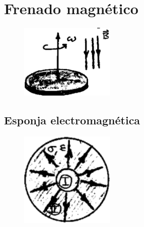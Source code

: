 \documentclass[10pt,oneside]{CBFT_book}
\begin{document}
\section{Frenado magnético}

\begin{figure}[htb]
	\begin{center}
	\includegraphics[width=0.4\textwidth]{images/fig_ft1_frenado.pdf}	 
	\end{center}
	\caption{}
\end{figure} 

\subsection{Esponja electromagnética}

\begin{figure}[htb]
	\begin{center}
	\includegraphics[width=0.4\textwidth]{images/fig_ft1_esponja.pdf}	 
	\end{center}
	\caption{}
\end{figure} 

\end{document}
